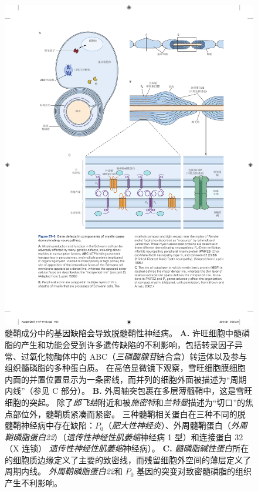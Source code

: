 \begin{figure}[htbp]
	\centering
	\includegraphics[width=1.0\linewidth]{chap57/fig_57_5}
	\caption{髓鞘成分中的基因缺陷会导致脱髓鞘性神经病。
		\textbf{A.} 许旺细胞中髓磷脂的产生和功能会受到许多遗传缺陷的不利影响，包括转录因子异常、过氧化物酶体中的 ABC（\textit{三磷酸腺苷}结合盒）转运体以及参与组织髓磷脂的多种蛋白质。
		在高倍显微镜下观察，雪旺细胞膜细胞内面的并置位置显示为一条密线，而并列的细胞外面被描述为“周期内线”（参见 C 部分）\cite{lupski1998molecular}。 
		\textbf{B.} 外周轴突包裹在多层薄髓鞘中，这是雪旺细胞的突起。
		除了\textit{郎飞结}附近和被\textit{施密特}和\textit{兰特曼}描述为“切口”的焦点部位外，髓鞘质紧凑而紧密。
		三种髓鞘相关蛋白在三种不同的脱髓鞘神经病中存在缺陷：$ P_0 $（\textit{肥大性神经炎}）、外周髓鞘蛋白（\textit{外周鞘磷脂蛋白22}）（\textit{遗传性神经性肌萎缩}神经病 1 型）和连接蛋白 32（X 连锁） \textit{遗传性神经性肌萎缩}神经病）\cite{lupski1998molecular}。
		\textbf{C.} \textit{髓磷脂碱性蛋白}所在的细胞质边缘定义了主要的致密线，而残留细胞外空间的薄层定义了周期内线。
		\textit{外周鞘磷脂蛋白22}和 $P_0$ 基因的突变对致密髓磷脂的组织产生不利影响\cite{brown2002inherited}。}
	\label{fig:57_5}
\end{figure}


